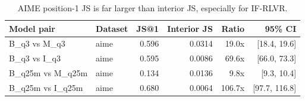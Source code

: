 \begin{table}[t]
\centering
\small
\caption{AIME position-1 JS is far larger than interior JS, especially for IF-RLVR.}
\label{tab:js-routing-localization}
\begin{tabular}{llrrrr}
\toprule
Model pair & Dataset & JS@1 & Interior JS & Ratio & 95\% CI \\
\midrule
B\_q3 vs M\_q3 & aime & 0.596 & 0.0314 & 19.0x & [18.4, 19.6] \\
B\_q3 vs I\_q3 & aime & 0.595 & 0.0086 & 69.6x & [66.0, 73.3] \\
B\_q25m vs M\_q25m & aime & 0.134 & 0.0136 & 9.8x & [9.3, 10.4] \\
B\_q25m vs I\_q25m & aime & 0.680 & 0.0064 & 106.7x & [97.7, 116.8] \\
\bottomrule
\end{tabular}
\end{table}
